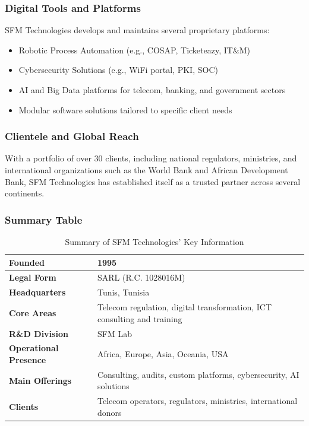 \documentclass[12pt,a4paper]{article}
\begin{document}
\subsubsection{Digital Tools and Platforms}
SFM Technologies develops and maintains several proprietary platforms:

\begin{itemize}
  \item Robotic Process Automation (e.g., COSAP, Ticketeazy, IT\&M)
  \item Cybersecurity Solutions (e.g., WiFi portal, PKI, SOC)
  \item AI and Big Data platforms for telecom, banking, and government sectors
  \item Modular software solutions tailored to specific client needs
\end{itemize}

\subsubsection{Clientele and Global Reach}
With a portfolio of over 30 clients, including national regulators, ministries, and international organizations such as the World Bank and African Development Bank, SFM Technologies has established itself as a trusted partner across several continents.

\subsubsection{Summary Table}

\begin{table}[H]
\centering
\begin{tabular}{|l|l|}
\hline
\textbf{Founded} & 1995 \\
\hline
\textbf{Legal Form} & SARL (R.C. 1028016M) \\
\hline
\textbf{Headquarters} & Tunis, Tunisia \\
\hline
\textbf{Core Areas} & Telecom regulation, digital transformation, ICT consulting and training \\
\hline
\textbf{R\&D Division} & SFM Lab \\
\hline
\textbf{Operational Presence} & Africa, Europe, Asia, Oceania, USA \\
\hline
\textbf{Main Offerings} & Consulting, audits, custom platforms, cybersecurity, AI solutions \\
\hline
\textbf{Clients} & Telecom operators, regulators, ministries, international donors \\
\hline
\end{tabular}
\caption{Summary of SFM Technologies' Key Information}
\end{table}
\end{document}

